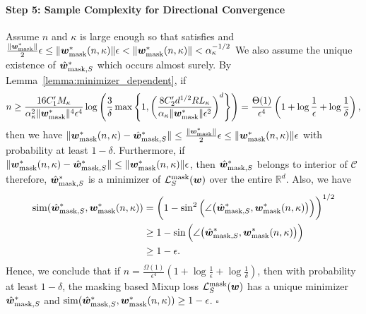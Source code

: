 \paragraph{Step 5: Sample Complexity for Directional Convergence} \quad

Assume $n$ and $\kappa$ is large enough so that satisfies  and $\frac{\lVert {\bm{w}}_{\mathrm{mask}}^*\rVert }{2} \epsilon \leq \lVert {\bm{w}}^*_\mathrm{mask}(n,\kappa) \rVert \epsilon < \lVert {\bm{w}}^*_\mathrm{mask}(n,\kappa) \rVert < \alpha_\kappa^{-1/2}$ We also assume the unique existence of $\hat{{\bm{w}}}_{\mathrm{mask},S}^*$ which occurs almost surely. By Lemma~\ref{lemma:minimizer_dependent}, if
\begin{equation*}
    n \geq  \frac{16 C_1'M_\kappa}{\alpha_\kappa^2 \lVert {\bm{w}}_{\mathrm{mask}}^* \rVert^4 \epsilon^4} \log \left( \frac{3}{\delta} \max \left\{ 1, \left( \frac{8C_2'd^{1/2}RL_\kappa}{\alpha_\kappa \lVert {\bm{w}}_{\mathrm{mask}} ^* \rVert \epsilon^2} \right)^d  \right\} \right) = \frac{\Theta(1)}{\epsilon^4} \left (1+ \log \frac{1}{\epsilon} + \log \frac{1}{\delta} \right ),
\end{equation*}
then we have $\lVert{\bm{w}}^*_\mathrm{mask}(n,\kappa) - \hat{{\bm{w}}}_{\mathrm{mask},S}^* \rVert \leq  \frac{\lVert {\bm{w}}_{\mathrm{mask}}^*\rVert }{2}  \epsilon \leq \lVert {\bm{w}}^*_\mathrm{mask}(n,\kappa) \rVert \epsilon$ with probability at least $1-\delta$.
Furthermore, if $\lVert {\bm{w}}^*_\mathrm{mask}(n,\kappa) - \hat{{\bm{w}}}_{\mathrm{mask},S}^* \rVert \leq  \lVert {\bm{w}}^*_\mathrm{mask}(n,\kappa) \rVert \epsilon$, then $\hat{{\bm{w}}}_{\mathrm{mask},S}^*$ belongs to interior of $\mathcal{C}$ therefore, $\hat{{\bm{w}}}_{\mathrm{mask},S}^*$ is a minimizer of $\mathcal{L}_S^\mathrm{mask}({\bm{w}})$ over the entire $\mathbb{R}^d$. Also, we have
\begin{align*}
    \mathrm{sim} ( \hat{{\bm{w}}}_{\mathrm{mask},S}^*,{\bm{w}}^*_\mathrm{mask}(n,\kappa))&=\bigg (1- \sin^2\Big(\angle\big(\hat{{\bm{w}}}_{\mathrm{mask},S}^*, {\bm{w}}^*_\mathrm{mask}(n,\kappa)\big)\Big)\bigg)^{1/2}\\
    &\geq 1- \sin\Big(\angle\big(\hat{{\bm{w}}}_{\mathrm{mask},S}^*, {\bm{w}}^*_\mathrm{mask}(n,\kappa)\big)\Big)\\
    &\geq 1- \epsilon.
\end{align*}
Hence, we conclude that if $n = \frac{\Omega(1)}{\epsilon^4} \left (1+ \log \frac{1}{\epsilon} + \log \frac{1}{\delta} \right )$, then with probability at least $1-\delta$,  the masking based Mixup loss $\mathcal{L}_S^\mathrm{mask}({\bm{w}})$ has a unique minimizer $\hat{{\bm{w}}}_{\mathrm{mask},S}^*$ and $\mathrm{sim} ( \hat{{\bm{w}}}_{\mathrm{mask},S}^*, {\bm{w}}^*_\mathrm{mask}(n,\kappa))\geq 1- \epsilon$. \hfill $\square$